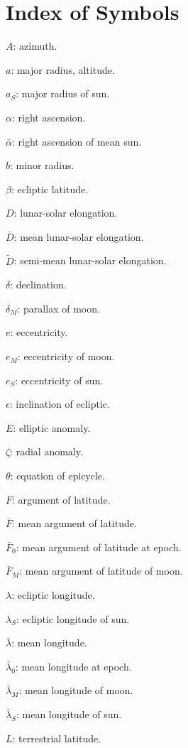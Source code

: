 \twocolumn
\chapter{Index of Symbols}
{\small
\begin{description}
\item $A$: azimuth.
\item $a$: major radius, altitude.
\item $a_S$: major radius of sun.
\item $\alpha$: right ascension.
\item $\bar{\alpha}$: right ascension of mean sun. 
\item $b$: minor radius.
\item $\beta$: ecliptic latitude. 
\item $D$: lunar-solar elongation.
\item$\bar {D}$: mean lunar-solar elongation.
\item $\tilde{D}$: semi-mean lunar-solar elongation.
\item $\delta$: declination. 
\item $\delta_M$: parallax of moon.
\item $e$: eccentricity.
\item $e_M$: eccentricity of moon.
\item $e_S$: eccentricity of sun.
\item $\epsilon$: inclination of ecliptic.
\item $E$: elliptic anomaly.
\item $\zeta$: radial anomaly. 
\item $\theta$: equation of epicycle.
\item $F$: argument of latitude.
\item $\bar{F}$: mean argument of latitude.
\item $\bar{F}_0$: mean argument of latitude at epoch.
\item $\bar{F}_M$: mean argument of latitude of moon.
\item $\lambda$: ecliptic longitude. 
\item $\lambda_S$: ecliptic longitude of sun.
\item $\bar{\lambda}$: mean longitude.
\item $\bar{\lambda}_0$: mean longitude at epoch. 
\item $\bar{\lambda}_M$: mean longitude of moon.
\item $\bar{\lambda}_S$: mean longitude of sun.
\item $L$: terrestrial latitude. 

\end{description}}
